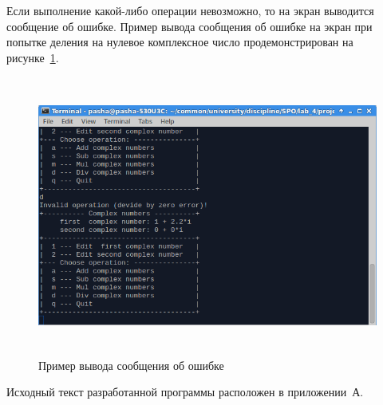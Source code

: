 Если выполнение какой-либо операции невозможно, то на экран выводится сообщение об ошибке. Пример вывода сообщения об ошибке на экран при попытке деления на нулевое комплексное число продемонстрирован на рисунке~\ref{fig:error}.

\begin{figure}[h!]
  \centering
  \includegraphics[width=150mm,height=92mm]{img/error}
  \caption{Пример вывода сообщения об ошибке}\label{fig:error}
\end{figure}

Исходный текст разработанной программы расположен в приложении~А.

\newpage